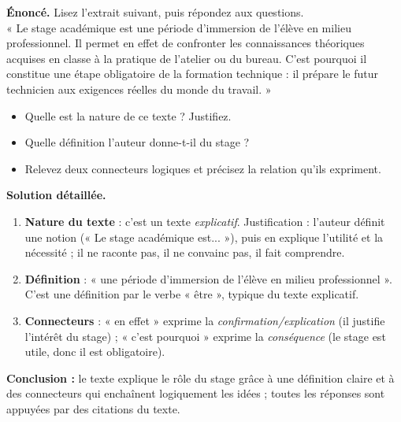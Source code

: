 \documentclass[11pt]{article}
\begin{document}
\begin{exoresolu}
\textbf{Énoncé.} Lisez l'extrait suivant, puis répondez aux questions.\\
« Le stage académique est une période d'immersion de l'élève en milieu professionnel. Il permet en effet de confronter les connaissances théoriques acquises en classe à la pratique de l'atelier ou du bureau. C'est pourquoi il constitue une étape obligatoire de la formation technique : il prépare le futur technicien aux exigences réelles du monde du travail. »
\begin{itemize}
\item[a.] Quelle est la nature de ce texte ? Justifiez.
\item[b.] Quelle définition l'auteur donne-t-il du stage ?
\item[c.] Relevez deux connecteurs logiques et précisez la relation qu'ils expriment.
\end{itemize}
\tcblower
\textbf{Solution détaillée.}
\begin{enumerate}
\item[a.] \textbf{Nature du texte} : c'est un texte \emph{explicatif}. Justification : l'auteur définit une notion (« Le stage académique est... »), puis en explique l'utilité et la nécessité ; il ne raconte pas, il ne convainc pas, il fait comprendre.
\item[b.] \textbf{Définition} : « une période d'immersion de l'élève en milieu professionnel ». C'est une définition par le verbe « être », typique du texte explicatif.
\item[c.] \textbf{Connecteurs} : « en effet » exprime la \emph{confirmation/explication} (il justifie l'intérêt du stage) ; « c'est pourquoi » exprime la \emph{conséquence} (le stage est utile, donc il est obligatoire).
\end{enumerate}
\textbf{Conclusion :} le texte explique le rôle du stage grâce à une définition claire et à des connecteurs qui enchaînent logiquement les idées ; toutes les réponses sont appuyées par des citations du texte.
\end{exoresolu}
\end{document}
